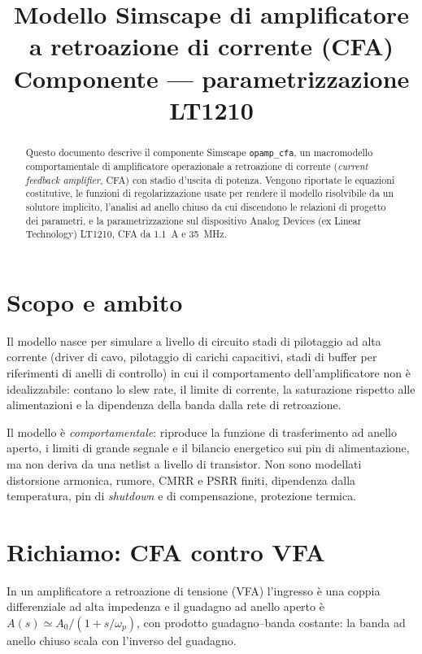 \documentclass[11pt,a4paper]{article}
\title{\textbf{Modello Simscape di amplificatore\\ a retroazione di corrente (CFA)}\\[2mm]
\large Componente \opamp{} --- parametrizzazione LT1210}
\author{}
\date{}
\newcommand{\opamp}{\texttt{opamp\_cfa}}
\begin{document}
\maketitle
\vspace{-12mm}

\begin{abstract}
\noindent
Questo documento descrive il componente Simscape \opamp{}, un macromodello
comportamentale di amplificatore operazionale a retroazione di corrente
(\emph{current feedback amplifier}, CFA) con stadio d'uscita di potenza.
Vengono riportate le equazioni costitutive, le funzioni di regolarizzazione
usate per rendere il modello risolvibile da un solutore implicito, l'analisi
ad anello chiuso da cui discendono le relazioni di progetto dei parametri, e
la parametrizzazione sul dispositivo Analog Devices (ex Linear Technology)
LT1210, CFA da \SI{1.1}{\ampere} e \SI{35}{\mega\hertz}.
\end{abstract}

\section{Scopo e ambito}

Il modello nasce per simulare a livello di circuito stadi di pilotaggio ad
alta corrente (driver di cavo, pilotaggio di carichi capacitivi, stadi di
buffer per riferimenti di anelli di controllo) in cui il comportamento
dell'amplificatore non è idealizzabile: contano lo slew rate, il limite di
corrente, la saturazione rispetto alle alimentazioni e la dipendenza della
banda dalla rete di retroazione.

Il modello è \emph{comportamentale}: riproduce la funzione di trasferimento
ad anello aperto, i limiti di grande segnale e il bilancio energetico sui
pin di alimentazione, ma non deriva da una netlist a livello di transistor.
Non sono modellati distorsione armonica, rumore, CMRR e PSRR finiti,
dipendenza dalla temperatura, pin di \emph{shutdown} e di compensazione,
protezione termica.

\section{Richiamo: CFA contro VFA}

In un amplificatore a retroazione di tensione (VFA) l'ingresso è una coppia
differenziale ad alta impedenza e il guadagno ad anello aperto è
$A(s)\simeq A_0/(1+s/\omega_p)$, con prodotto guadagno--banda costante: la
banda ad anello chiuso scala con l'inverso del guadagno.
\end{document}
